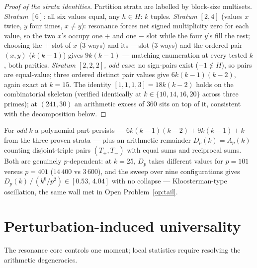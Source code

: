 \documentclass[11pt]{article}
\begin{document}
\begin{proof}[Proof of the strata identities]
Partition strata are labelled by block-size multisets.
\emph{Stratum $[6]$}: all six values equal, any $h\in H$: $k$ tuples.
\emph{Stratum $[2,4]$} (values $x$ twice, $y$ four times,
$x\neq y$): resonance forces net signed multiplicity zero for each
value, so the two $x$'s occupy one $+$ and one $-$ slot while the four
$y$'s fill the rest; choosing the $+$-slot of $x$ ($3$ ways) and its
$-$-slot ($3$ ways) and the ordered pair $(x,y)$
($k(k-1)$) gives $9k(k-1)$ --- matching enumeration at every tested
$k$, both parities.
\emph{Stratum $[2,2,2]$, odd case}: no sign-pairs exist
($-1\notin H$), so pairs are equal-value; three ordered distinct pair
values give $6k(k-1)(k-2)$, again exact at $k=15$.
The identity $[1,1,1,3]=18k(k-2)$ holds on the combinatorial skeleton
(verified identically at $k\in\{10,14,16,20\}$ across three primes);
at $(241,30)$ an arithmetic excess of $360$ sits on top of it,
consistent with the decomposition below.
\end{proof}

For \emph{odd} $k$ a polynomial part persists ---
$6k(k-1)(k-2)+9k(k-1)+k$ from the three proven strata --- plus an
arithmetic remainder $D_p(k)=A_p(k)$ counting disjoint-triple pairs
$(T_{+},T_{-})$ with equal sums and reciprocal sums.
Both are genuinely $p$-dependent: at $k=25$, $D_p$ takes different
values for $p=101$ versus $p=401$
($14\,400$ vs $3\,600$), and the sweep over nine configurations gives
$D_p(k)\,/\,(k^{6}/p^{2})\in[0.53,\,4.04]$ with no collapse ---
Kloosterman-type oscillation, the same wall met in
Open Problem~\ref{op:tail}.

\section{Perturbation-induced universality}\label{sec:perturb}

The resonance core controls one moment; local statistics require
resolving the arithmetic degeneracies.
\end{document}
